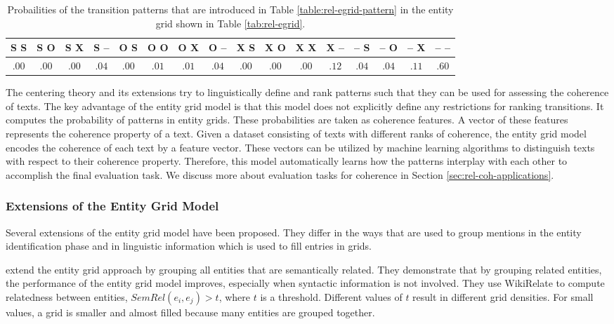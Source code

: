 \begin{table}
	\begin{center}
		\resizebox{\columnwidth}{!}
		{%
			\begin{tabular}{@{}cccccccccccccccc@{}}
				\toprule
				S S & S O & S X & S -- & O S & O O & O X & O -- & X S & X O & X X & X -- & -- S & -- O & -- X & -- -- \\
				\midrule
				$.00$ & $.00$ & $.00$ & $.04$ & $.00$ & $.01$ & $.01$ & $.04$ & $.00$ & $.00$ & $.00$ & $.12$ & $.04$ & $.04$ & $.11$ & $.60$ \\
				\bottomrule
			\end{tabular}
		}%
	\end{center}
	\caption{Probailities of the transition patterns that are introduced in Table \ref{table:rel-egrid-pattern} in the entity grid shown in Table \ref{tab:rel-egrid}.}
	\label{tab:rel-egrid-probs}
\end{table}

The centering theory and its extensions try to linguistically define and rank patterns such that they can be used for assessing the coherence of texts. 
The key advantage of the entity grid model is that this model does not explicitly define any restrictions for ranking transitions. 
It computes the probability of patterns in entity grids. 
These probabilities are taken as coherence features.  
A vector of these features represents the coherence property of a text. 
Given a dataset consisting of texts with different ranks of coherence, the entity grid model encodes the coherence of each text by a feature vector.  
These vectors can be utilized by machine learning algorithms to distinguish texts with respect to their coherence property. 
Therefore, this model automatically learns how the patterns interplay with each other to accomplish the final evaluation task. 
We discuss more about evaluation tasks for coherence in Section \ref{sec:rel-coh-applications}.

\subsubsection{Extensions of the Entity Grid Model}
%
Several extensions of the entity grid model have been proposed. 
They differ in the ways that are used to group mentions in the entity identification phase and in linguistic information which is used to fill entries in grids. 

 extend the entity grid approach by grouping all entities that are semantically related.  
They demonstrate that by grouping related entities, the performance of the entity grid model improves, especially when syntactic information is not involved. 
They use WikiRelate \cite{strube.aaai06} to compute relatedness between entities, $SemRel(e_i,e_j) >t$, where $t$ is a threshold.
Different values of $t$ result in different grid densities. 
For small values, a grid is smaller and almost filled because many entities are grouped together. 

